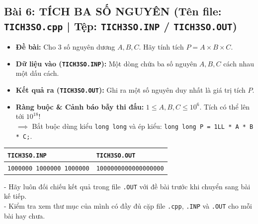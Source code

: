 \documentclass[11pt,a4paper]{article}
\begin{document}
\subsection*{\color{AsianDarkBlue}\small Bài 6: TÍCH BA SỐ NGUYÊN (Tên file: \texttt{TICH3SO.cpp} | Tệp: \texttt{TICH3SO.INP} / \texttt{TICH3SO.OUT})}
\begin{itemize}
    \setlength{\itemsep}{0.5pt}
    \footnotesize
    \item \textbf{Đề bài:} Cho 3 số nguyên dương $A, B, C$. Hãy tính tích $P = A \times B \times C$.
    \item \textbf{Dữ liệu vào (\texttt{TICH3SO.INP}):} Một dòng chứa ba số nguyên $A, B, C$ cách nhau một dấu cách.
    \item \textbf{Kết quả ra (\texttt{TICH3SO.OUT}):} Ghi ra một số nguyên duy nhất là giá trị tích $P$.
    \item \textbf{Ràng buộc \& Cảnh báo bẫy thi đấu:} $1 \le A, B, C \le 10^6$. Tích có thể lên tới $10^{18}$!\\
    $\implies$ Bắt buộc dùng kiểu \texttt{long long} và ép kiểu: \texttt{long long P = 1LL * A * B * C;}.
\end{itemize}
\vspace{-2mm}
\begin{center}
\footnotesize
\begin{tabular}{|p{7.8cm}|p{7.8cm}|}
\hline
\textbf{\texttt{TICH3SO.INP}} & \textbf{\texttt{TICH3SO.OUT}} \\
\hline
\texttt{1000000 1000000 1000000} & \texttt{1000000000000000000} \\
\hline
\end{tabular}
\end{center}

\vspace{-1mm}
\begin{tcolorbox}[colback=AsianBlue!5!white,colframe=AsianDarkBlue,arc=1mm,title=\textbf{\footnotesize LƯU Ý DÀNH CHO HỌC SINH SAU KHI LÀM XONG 6 BÀI TẬP}]
\footnotesize
- Hãy luôn đối chiếu kết quả trong file \texttt{.OUT} với đề bài trước khi chuyển sang bài kế tiếp.\\
- Kiểm tra xem thư mục của mình có đầy đủ cặp file \texttt{.cpp}, \texttt{.INP} và \texttt{.OUT} cho mỗi bài hay chưa.
\end{tcolorbox}
\end{document}
